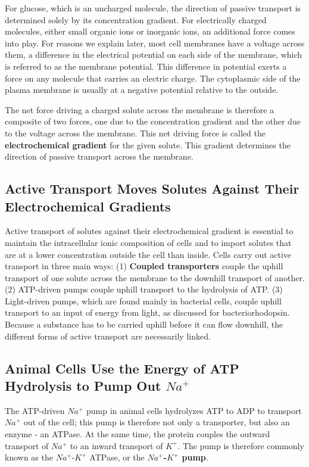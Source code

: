 For glucose, which is an uncharged molecule, the direction of passive
transport is determined solely by its concentration gradient. For electrically
charged molecules, either small organic ions or inorganic ions, an
additional force comes into play. For reasons we explain later, most cell
membranes have a voltage across them, a difference in the electrical
potential on each side of the membrane, which is referred to as the membrane
potential. This difference in potential exerts a force on any molecule
that carries an electric charge. The cytoplasmic side of the plasma membrane
is usually at a negative potential relative to the outside.

The net force driving a charged solute across the membrane is therefore
a composite of two forces, one due to the concentration gradient and the
other due to the voltage across the membrane. This net driving force is
called the \textbf{electrochemical gradient} for the given solute. This gradient
determines the direction of passive transport across the membrane.

\subsection{Active Transport Moves Solutes Against Their Electrochemical Gradients}

Active transport of solutes against their electrochemical gradient is essential to maintain
the intracellular ionic composition of cells and to import solutes that are
at a lower concentration outside the cell than inside. Cells carry out active
transport in three main ways: (1) \textbf{Coupled transporters} couple
the uphill transport of one solute across the membrane to the downhill
transport of another. (2) ATP-driven pumps couple uphill transport to the
hydrolysis of ATP. (3) Light-driven pumps, which are found mainly in bacterial
cells, couple uphill transport to an input of energy from light, as
discussed for bacteriorhodopsin.
Because a substance has to be carried uphill before it can flow downhill,
the different forms of active transport are necessarily linked.

\subsection{Animal Cells Use the Energy of ATP Hydrolysis to Pump Out $Na^{+}$}

The ATP-driven $Na^{+}$ pump in animal cells hydrolyzes ATP to ADP to transport
$Na^{+}$ out of the cell; this pump is therefore not only a transporter,
but also an enzyme - an ATPase. At the same time, the protein couples
the outward transport of $Na^{+}$ to an inward transport of $K^{+}$. The pump is
therefore commonly known as the $Na^{+}$-$K^{+}$ ATPase, or the \textbf{$Na^{+}$-$K^{+}$ pump}.

